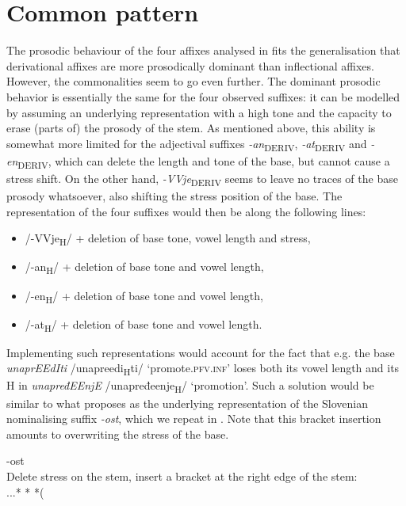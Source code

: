 \documentclass[output=paper]{langsci/langscibook}
\begin{document}
\section{Common pattern}\label{sec:simonovic:5}

The prosodic behaviour of the four affixes analysed in  fits the generalisation that derivational affixes are more prosodically dominant than inflectional affixes. However, the commonalities seem to go even further. The dominant prosodic behavior is essentially the same for the four observed suffixes: it can be modelled by assuming an underlying representation with a high tone and the capacity to erase (parts of) the prosody of the stem. As mentioned above, this ability is somewhat more limited for the adjectival suffixes \textit{-an}\textsubscript{DERIV}, \textit{-at}\textsubscript{DERIV} and \textit{-en}\textsubscript{DERIV}, which can delete the length and tone of the base, but cannot cause a stress shift. On the other hand, \textit{-VVje}\textsubscript{DERIV}  seems to leave no traces of the base prosody whatsoever, also shifting the stress position of the base. The representation of the four suffixes would then be along the following lines: \begin{itemize}
\item /-VVje\textsubscript{H}/ + deletion of base tone, vowel length and stress,
\item /-an\textsubscript{H}/ + deletion of base tone and vowel length,
\item /-en\textsubscript{H}/ + deletion of base tone and vowel length, 
\item /-at\textsubscript{H}/ + deletion of base tone and vowel length.
\end{itemize}

Implementing such representations would account for the fact that e.g. the base \textit{unaprEEdIti }/unapreedi\textsubscript{H}ti/ `promote.\textsc{pfv.inf}' loses both its vowel length and its H in \textit{unapređEEnjE} /unapređeenje\textsubscript{H}/ `promotion'. Such a solution would be similar to what \citet{Mar2002} proposes as the underlying representation of the Slovenian nominalising suffix \textit{-ost}, which we repeat in . Note that this bracket insertion amounts to overwriting the stress of the base.

\ea \label{ex:simonovic:5} \gll -ost \\ Delete stress on the stem, insert a bracket at the right edge of the stem: \\...* * *( 
		\\ 
\z
\end{document}
